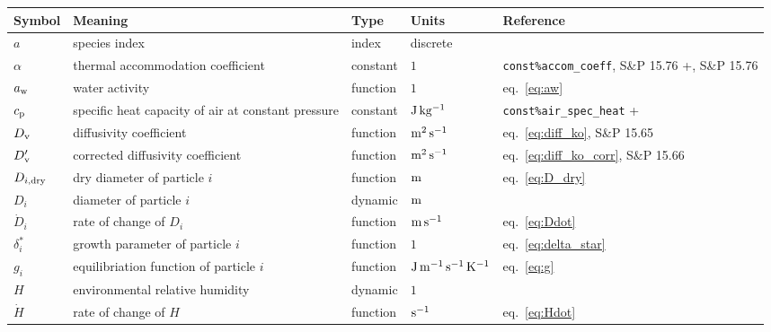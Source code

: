 \documentclass{article}
\begin{document}
\newcommand{\rr}{\raggedright}
\newcommand{\tn}{\tabularnewline\hline}
\renewcommand{\arraystretch}{1.5}
\begin{longtable}{|l|p{5.5cm}|l|l|p{4.5cm}|}
\hline \textbf{Symbol}       & \textbf{Meaning}                                            & \textbf{Type} & \textbf{Units}                                  &  \textbf{Reference}                                \tn \hline \endhead
$a$                 & \rr species index                          & index & discrete & \tn
$\alpha$            & \rr thermal accommodation coefficient                  & constant & $1$                                              & \rr \verb+const%accom_coeff+, S\&P 15.76      \tn
$a_{\rm w}$         & \rr water activity                                     & function & $1$                                        & \rr eq.~\ref{eq:aw}                           \tn
$c_{\rm p}$         & \rr specific heat capacity of air at constant pressure & constant & $\rm J \, kg^{-1}$                          & \rr \verb+const%air_spec_heat+                \tn
$D_{\rm v}$         & \rr diffusivity coefficient                            & function & $\rm m^2 \, s^{-1}$                   & \rr eq.~\ref{eq:diff_ko}, S\&P 15.65          \tn
$D_{\rm v}'$        & \rr corrected diffusivity coefficient                  & function & $\rm m^2 \, s^{-1}$                   & \rr eq.~\ref{eq:diff_ko_corr}, S\&P 15.66     \tn
$D_{i,\rm dry}$     & \rr dry diameter of particle $i$               & function & $\rm m$                                  & \rr eq.~\ref{eq:D_dry}                                          \tn
$D_i$               & \rr diameter of particle $i$                               & dynamic & $\rm m$                              & \rr                                           \tn
$\dot{D}_i$         & \rr rate of change of $D_i$                            & function & $\rm m \, s^{-1}$ & \rr eq.~\ref{eq:Ddot} \tn
$\delta_i^*$          & \rr growth parameter of particle $i$                                   & function & $1$                                        & \rr eq.~\ref{eq:delta_star}                   \tn
$g_i$              & \rr equilibriation function of particle $i$          & function & $\rm J \, m^{-1} \, s^{-1} \, K^{-1}$ & \rr eq.~\ref{eq:g} \tn
$H$                 & \rr environmental relative humidity                    & dynamic & $1$                               &                                           \tn
$\dot{H}$         & \rr rate of change of $H$       & function & $\rm s^{-1}$                                                 & \rr eq.~\ref{eq:Hdot}                                          \tn

\end{longtable}
\end{document}
